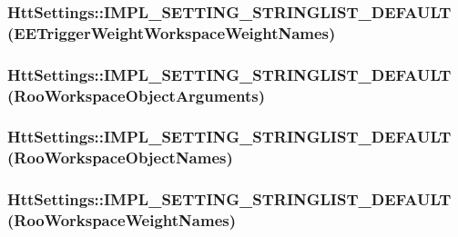 \label{classHttSettings_aef75c48c8c9dfd3d5059332be5635d1d}
\hypertarget{classHttSettings_a8d7748f74329a8eca5f2574b4cd9ecb8}{
\subsubsection[{IMPL\_\-SETTING\_\-STRINGLIST\_\-DEFAULT}]{\setlength{\rightskip}{0pt plus 5cm}HttSettings::IMPL\_\-SETTING\_\-STRINGLIST\_\-DEFAULT (EETriggerWeightWorkspaceWeightNames)}}
\label{classHttSettings_a8d7748f74329a8eca5f2574b4cd9ecb8}
\hypertarget{classHttSettings_aab59102695ddf2fa3f151627b385e0c6}{
\subsubsection[{IMPL\_\-SETTING\_\-STRINGLIST\_\-DEFAULT}]{\setlength{\rightskip}{0pt plus 5cm}HttSettings::IMPL\_\-SETTING\_\-STRINGLIST\_\-DEFAULT (RooWorkspaceObjectArguments)}}
\label{classHttSettings_aab59102695ddf2fa3f151627b385e0c6}
\hypertarget{classHttSettings_a16bc0e064dfe53c5a89b046d5e0081a2}{
\subsubsection[{IMPL\_\-SETTING\_\-STRINGLIST\_\-DEFAULT}]{\setlength{\rightskip}{0pt plus 5cm}HttSettings::IMPL\_\-SETTING\_\-STRINGLIST\_\-DEFAULT (RooWorkspaceObjectNames)}}
\label{classHttSettings_a16bc0e064dfe53c5a89b046d5e0081a2}
\hypertarget{classHttSettings_a8daa9985fff6d954be88d243601b56f8}{
\subsubsection[{IMPL\_\-SETTING\_\-STRINGLIST\_\-DEFAULT}]{\setlength{\rightskip}{0pt plus 5cm}HttSettings::IMPL\_\-SETTING\_\-STRINGLIST\_\-DEFAULT (RooWorkspaceWeightNames)}}
